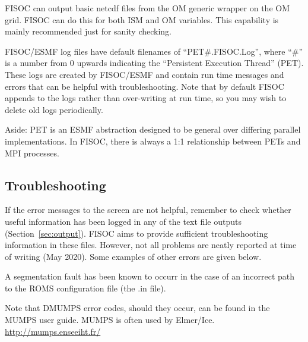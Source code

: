 \documentclass[11pt]{article}
\begin{document}
FISOC can output basic netcdf files from the OM generic wrapper 
on the OM grid. 
FISOC can do this for both ISM and OM variables.
This capability is mainly recommended just for sanity checking.


FISOC/ESMF log files have default filenames of ``PET\#.FISOC.Log'', where ``\#'' is a number from 0 upwards 
indicating the ``Persistent Execution Thread'' (PET). 
These logs are created by FISOC/ESMF and contain run time messages and errors that can 
be helpful with troubleshooting.
Note that by default FISOC appends to the logs rather than over-writing at run time, so you may wish to delete 
old logs periodically. 

Aside: PET is an ESMF abstraction designed to be general over differing parallel implementations. 
In FISOC, there is always a 1:1 relationship between PETs and MPI processes. 





\subsection{Troubleshooting}

If the error messages to the screen are not helpful, remember to check whether useful 
information has been logged in any of the text file outputs (Section~\ref{sec:output}).
FISOC aims to provide sufficient troubleshooting information in these files.
However, not all problems are neatly reported at time of writing (May 2020).
Some examples of other errors are given below.

A segmentation fault has been known to occurr in the case of an incorrect path to the ROMS 
configuration file (the .in file). 

Note that DMUMPS error codes, should they occur, can be found in the MUMPS user guide.
MUMPS is often used by Elmer/Ice.
\url{http://mumps.enseeiht.fr/}
\end{document}
